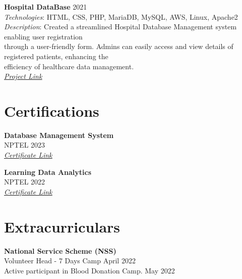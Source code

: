 \documentclass[a4paper,8pt]{article}
\begin{document}
\textbf{Hospital DataBase} \hfill 2021\\
\textit{Technologies}: HTML, CSS, PHP, MariaDB, MySQL, AWS, Linux, Apache2 \\
\textit{Description}:  Created a streamlined Hospital Database Management system enabling user registration \\
through a user-friendly form. Admins can easily access and view details of registered patients, enhancing the \\
efficiency of healthcare data management.\\
\textit{\href{https://github.com/yashasc2k1/webfilesrr}{\underline{Project Link}}}


\section*{Certifications}

\textbf{Database Management System} \\
NPTEL \hfill 2023 \\
\textit{\href{https://internalapp.nptel.ac.in/noc/Ecertificate/?q=NPTEL23CS41S1422070903136655}{\underline{Certificate Link}}}

\textbf{Learning Data Analytics} \\
NPTEL \hfill 2022 \\
\textit{\href{https://archive.nptel.ac.in/noc/Ecertificate/?q=NPTEL22GE26S3394039710215318}{\underline{Certificate Link}}}




\section*{Extracurriculars}
\textbf{National Service Scheme (NSS)} \\
Volunteer Head - 7 Days Camp \hfill April 2022 \\
Active participant in Blood Donation Camp. \hfill May 2022
\end{document}
